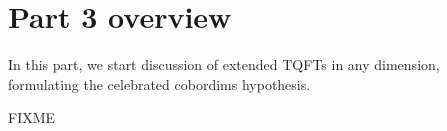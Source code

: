\chapter*{Part 3 overview}\label{c:p3-overview}
In this part, we start discussion of extended TQFTs in
any dimension, formulating the celebrated cobordims hypothesis.

FIXME